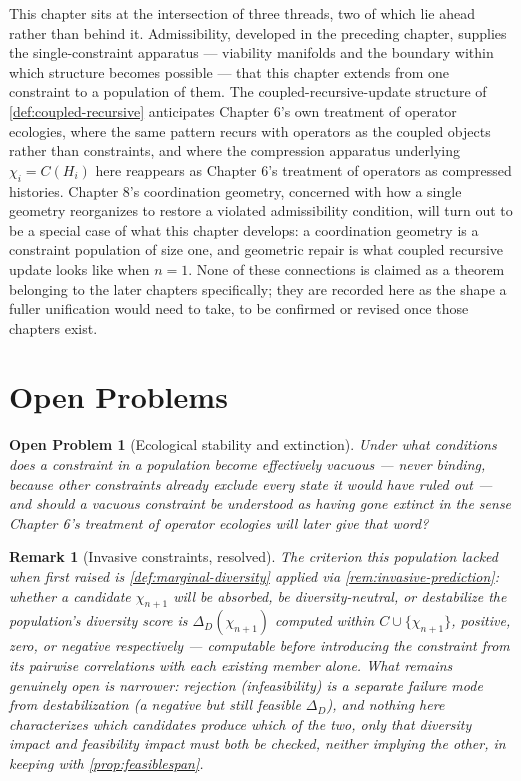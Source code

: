 \documentclass[12pt]{report}
\newtheorem{openproblem}[definition]{Open Problem}
\newtheorem{remark}[definition]{Remark}
\begin{document}
This chapter sits at the intersection of three threads, two of which lie
ahead rather than behind it. Admissibility, developed in the preceding
chapter, supplies the single-constraint apparatus --- viability
manifolds and the boundary within which structure becomes possible ---
that this chapter extends from one constraint to a population of them.
The coupled-recursive-update structure of \cref{def:coupled-recursive}
anticipates Chapter 6's own treatment of operator ecologies, where the
same pattern recurs with operators as the coupled objects rather than
constraints, and where the compression apparatus underlying $\chi_i =
C(H_i)$ here reappears as Chapter 6's treatment of operators as
compressed histories. Chapter 8's coordination geometry, concerned with
how a single geometry reorganizes to restore a violated admissibility
condition, will turn out to be a special case of what this chapter
develops: a coordination geometry is a constraint population of size
one, and geometric repair is what coupled recursive update looks like
when $n = 1$. None of these connections is claimed as a theorem
belonging to the later chapters specifically; they are recorded here as
the shape a fuller unification would need to take, to be confirmed or
revised once those chapters exist.

\section*{Open Problems}

\begin{openproblem}[Ecological stability and extinction]
Under what conditions does a constraint in a population become
effectively vacuous --- never binding, because other constraints
already exclude every state it would have ruled out --- and should a
vacuous constraint be understood as having gone extinct in the sense
Chapter 6's treatment of operator ecologies will later give that word?
\end{openproblem}

\begin{remark}[Invasive constraints, resolved]
\label{rem:invasive-resolved}
The criterion this population lacked when first raised is
\cref{def:marginal-diversity} applied via \cref{rem:invasive-prediction}:
whether a candidate $\chi_{n+1}$ will be absorbed, be diversity-neutral,
or destabilize the population's diversity score is $\Delta_D(\chi_{n+1})$
computed within $C \cup \{\chi_{n+1}\}$, positive, zero, or negative
respectively --- computable before introducing the constraint from its
pairwise correlations with each existing member alone. What remains
genuinely open is narrower: rejection (infeasibility) is a separate
failure mode from destabilization (a negative but still feasible
$\Delta_D$), and nothing here characterizes which candidates produce
which of the two, only that diversity impact and feasibility impact must
both be checked, neither implying the other, in keeping with
\cref{prop:feasiblespan}.
\end{remark}
\end{document}
